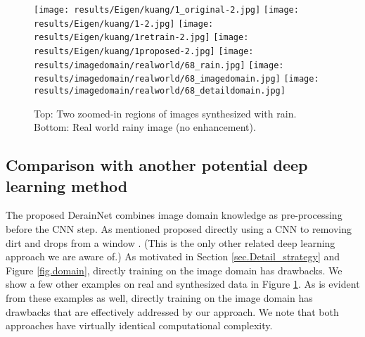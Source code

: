\documentclass[journal]{IEEEtran}
\begin{document}
\begin{figure}
{\texttt{[image: results/Eigen/kuang/1\_original-2.jpg]}}
{\texttt{[image: results/Eigen/kuang/1-2.jpg]}}
{\texttt{[image: results/Eigen/kuang/1retrain-2.jpg]}}
{\texttt{[image: results/Eigen/kuang/1proposed-2.jpg]}}\vspace{2pt}
 \texttt{[image: results/imagedomain/realworld/68\_rain.jpg]}
  \texttt{[image: results/imagedomain/realworld/68\_imagedomain.jpg]}
   \texttt{[image: results/imagedomain/realworld/68\_detaildomain.jpg]}\vspace{2pt}
   \caption{Top: Two zoomed-in regions of images synthesized with rain. Bottom: Real world rainy image (no enhancement).}\label{fig.CNNvsDerainNet}
\end{figure}


\subsection{Comparison with another potential deep learning method}
The proposed DerainNet combines image domain knowledge as pre-processing before the CNN step. As mentioned \cite{15} proposed directly using a CNN to removing dirt and drops from a window \cite{15}. (This is the only other related deep learning approach we are aware of.) As motivated in Section \ref{sec.Detail_strategy} and Figure \ref{fig.domain}, directly training on the image domain has drawbacks. We show a few other examples on real and synthesized data in Figure \ref{fig.CNNvsDerainNet}. As is evident from these examples as well, directly training on the image domain has drawbacks that are effectively addressed by our approach. We note that both approaches have virtually identical computational complexity.
\end{document}
